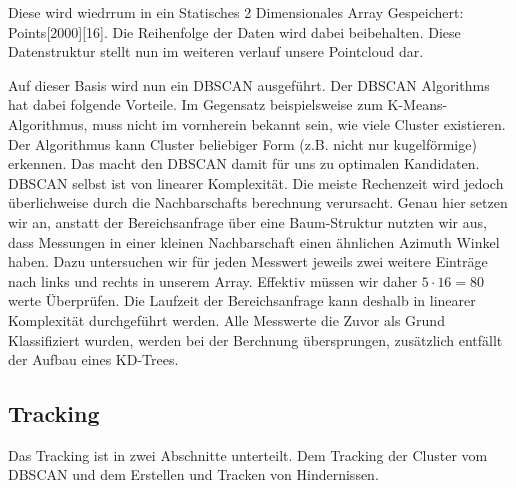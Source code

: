 \documentclass[11pt,oneside,openright]{mpreport}
\begin{document}
\begin{center}
\end{center}

Diese wird wiedrrum in ein Statisches 2 Dimensionales Array Gespeichert: Points[2000][16]. Die Reihenfolge der Daten wird dabei beibehalten.
Diese Datenstruktur stellt nun im weiteren verlauf unsere Pointcloud dar.

Auf dieser Basis wird nun ein \ac{DBSCAN} \cite{DBSCAN} ausgeführt. Der \ac{DBSCAN} Algorithms hat dabei folgende Vorteile.
Im Gegensatz beispielsweise zum K-Means-Algorithmus, muss nicht im vornherein bekannt sein, wie viele Cluster existieren. Der Algorithmus kann Cluster beliebiger Form 
(z.B. nicht nur kugelförmige) erkennen. Das macht den \ac{DBSCAN} damit für uns zu optimalen Kandidaten. \ac{DBSCAN} selbst ist von linearer Komplexität.
Die meiste Rechenzeit wird jedoch überlichweise durch die Nachbarschafts berechnung verursacht. Genau hier setzen wir an, anstatt der Bereichsanfrage über eine Baum-Struktur
nutzten wir aus, dass Messungen in einer kleinen Nachbarschaft einen ähnlichen Azimuth Winkel haben. Dazu untersuchen wir für jeden Messwert jeweils zwei weitere Einträge nach links
und rechts in unserem Array. Effektiv müssen wir daher $5 \cdot 16 = 80$ werte Überprüfen. Die Laufzeit der Bereichsanfrage kann deshalb in linearer Komplexität durchgeführt
werden. Alle Messwerte die Zuvor als Grund Klassifiziert wurden, werden bei der Berchnung übersprungen, zusätzlich entfällt der Aufbau eines KD-Trees. 


\subsection{Tracking}

Das Tracking ist in zwei Abschnitte unterteilt. Dem Tracking der Cluster vom \ac{DBSCAN} und dem Erstellen und Tracken von Hindernissen.
\end{document}
